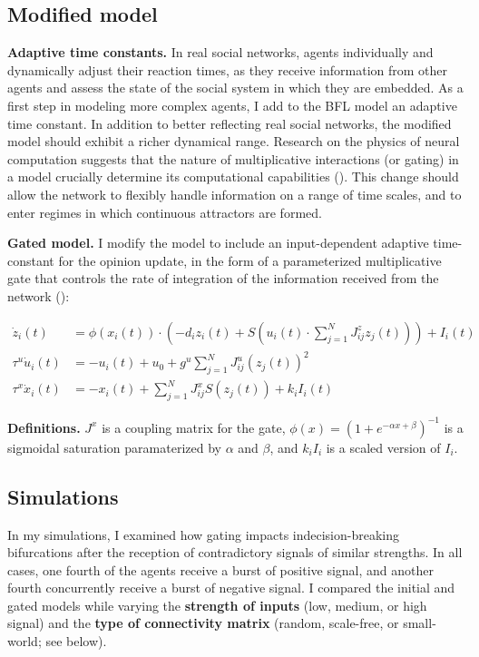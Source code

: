 \documentclass[]{article}
\begin{document}
\subsection{Modified model}

\textbf{Adaptive time constants.} In real social networks, agents individually and dynamically adjust their reaction times, as they receive information from other agents and assess the state of the social system in which they are embedded. As a first step in modeling more complex agents, I add to the BFL model an adaptive time constant. In addition to better reflecting real social networks, the modified model should exhibit a richer dynamical range. Research on the physics of neural computation suggests that the nature of multiplicative interactions (or gating) in a model crucially determine its computational capabilities (\cite{krishnamurthyTheoryGatingRecurrent2022}). This change should allow the network to flexibly handle information on a range of time scales, and to enter regimes in which continuous attractors are formed. 

\textbf{Gated model.} I modify the model to include an input-dependent adaptive time-constant for the opinion update, in the form of a parameterized multiplicative gate that controls the rate of integration of the information received from the network (\cite{krishnamurthyTheoryGatingRecurrent2022}):

\begin{align}
	\dot{z}_{i}(t) &= \phi \left( x_i(t) \right) \cdot \left( -d_{i}z_{i}(t) + S \left( u_i(t) \cdot  \sum^{N}_{j=1} J^z_{ij}z_{j}(t)  \right) \right) + I_{i}(t) \\
	\tau^u \dot{u}_i(t) &=  -u_i(t)+u_0+g^u \sum ^{N}_{j=1} J^u_{ij}(z_{j}(t))^2 \\
	\tau^x \dot{x}_i(t) &= -x_i(t) +  \sum ^{N}_{j=1} J^x_{ij} S(z_j(t)) + k_i I_i(t)
\end{align}

\textbf{Definitions.} $J^x$ is a coupling matrix for the gate, $\phi (x) = (1 + e^{- \alpha x + \beta })^{-1}$ is a sigmoidal saturation paramaterized by $\alpha$ and $\beta$, and $k_i I_i$ is a scaled version of $I_i$.

\subsection{Simulations}

In my simulations, I examined how gating impacts indecision-breaking bifurcations after the reception of contradictory signals of similar strengths. In all cases, one fourth of the agents receive a burst of positive signal, and another fourth concurrently receive a burst of negative signal. I compared the initial and gated models while varying the \textbf{strength of inputs} (low, medium, or high signal) and the \textbf{type of connectivity matrix} (random, scale-free, or small-world; see below).
\end{document}
